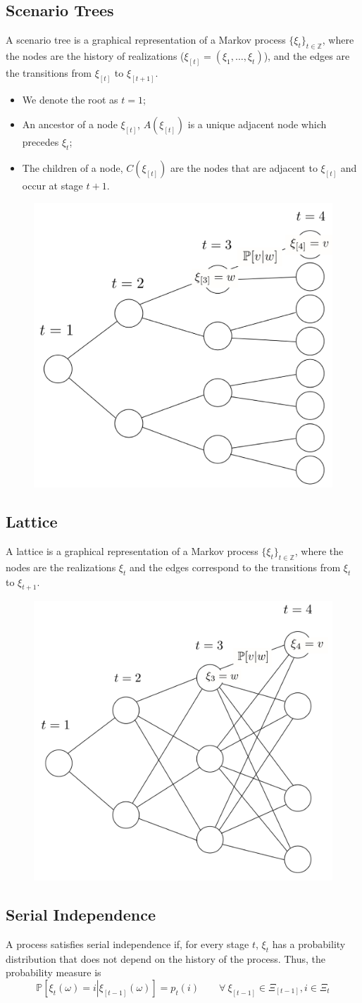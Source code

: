 \documentclass[12pt, openany]{report}
\renewcommand{\P}{\mathbb{P}}
\newcommand{\Z}{\mathbb{Z}}
\theoremstyle{definition}
\begin{document}
\subsection{Scenario Trees}
A scenario tree is a graphical representation of a Markov process $\{\xi_t\}_{t\in \Z}$, where the nodes are the history of realizations ($\xi_{[t]}=(\xi_1,\dots,\xi_t)$), and the edges are the transitions from $\xi_{[t]}$ to $\xi_{[t+1]}$.
\begin{itemize}
	\item We denote the root as $t=1$;
	\item An ancestor of a node $\xi_{[t]}$, $A(\xi_{[t]})$ is a unique adjacent node which precedes $\xi_t$;
	\item The children of a node, $C(\xi_{[t]})$ are the nodes that are adjacent to $\xi_{[t]}$ and occur at stage $t+1$.
\end{itemize}
\begin{figure}[H]
	\centering 
	\includegraphics[width = .3\textwidth]{img/tree.png}
\end{figure}
\subsection{Lattice}
A lattice is a graphical representation of a Markov process $\{\xi_t\}_{t\in \Z}$, where the nodes are the realizations $\xi_t$ and the edges correspond to the transitions from $\xi_t$ to $\xi_{t+1}$. 
\begin{figure}[H]
	\centering 
	\includegraphics[width = .3\textwidth]{img/lattice.png}
\end{figure}
\subsection{Serial Independence}\label{sec:serial_ind}
A process satisfies serial independence if, for every stage $t$, $\xi_t$ has a probability distribution that does not depend on the history of the process. Thus, the probability measure is 
\begin{equation}
	\P\left[\xi_t(\omega)=i\left|\xi_{[t-1]}(\omega)\right.\right] = p_t(i) \qquad \forall \ \xi_{[t-1]}\in\Xi_{[t-1]}, i\in\Xi_t
\end{equation}
\end{document}
